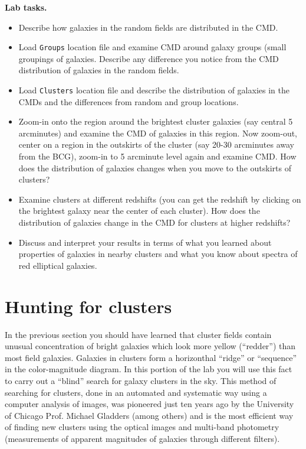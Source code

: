 \documentclass[12pt]{article}
\begin{document}
{\bf Lab tasks.} 
{\it
\begin{itemize}
\item Describe how galaxies in the random fields are distributed in the CMD. 
\item Load {\tt Groups} location file and examine CMD around galaxy groups (small groupings
of galaxies. Describe any difference you notice from the CMD distribution of galaxies in
the random fields. 
\item Load {\tt Clusters} location file and describe the distribution of galaxies in the CMDs
and the differences from random and group locations. 
\item Zoom-in onto the region around the brightest cluster galaxies (say central 5 arcminutes) and
examine the CMD of galaxies in this region. Now zoom-out, center on a region in the outskirts 
of the cluster (say 20-30 arcminutes away from the BCG), zoom-in to 5 arcminute level again and examine
CMD. How does the distribution of galaxies changes when you move to the
outskirts of clusters?
\item Examine clusters at different redshifts (you can get the redshift by clicking on the
brightest galaxy near the center of each cluster). How does the distribution of galaxies 
change in the CMD for clusters at higher redshifts?
\item Discuss and interpret your results in terms of what you learned about properties
of galaxies in nearby clusters and what you know about spectra of red elliptical galaxies. 
\end{itemize}
}

\section*{Hunting for clusters}

In the previous section you should have learned that cluster fields
contain unusual concentration of bright galaxies which look more
yellow (``redder'') than most field galaxies. Galaxies in clusters
form a horizonthal ``ridge'' or ``sequence'' in the color-magnitude
diagram. In this portion of the lab you will use this fact to carry
out a ``blind'' search for galaxy clusters in the sky. This method of
searching for clusters, done in an automated and systematic way using
a computer analysis of images, was pioneered just ten years ago by the
University of Chicago Prof. Michael Gladders (among others) and is the
most efficient way of finding new clusters using the optical images
and multi-band photometry (measurements of apparent magnitudes of
galaxies through different filters).
\end{document}
